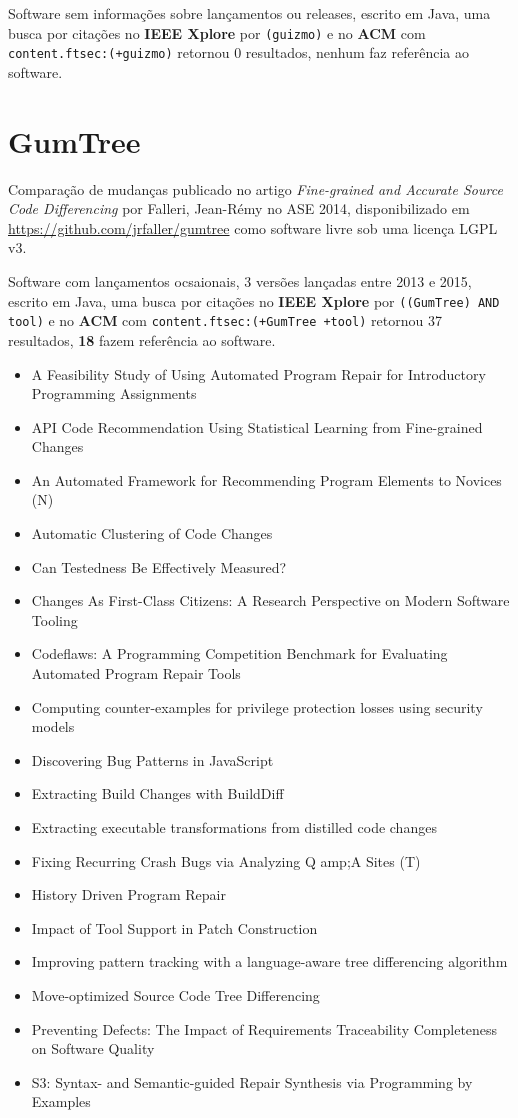 Software sem informações sobre lançamentos ou releases,
escrito em Java,
uma busca por citações no {\bf IEEE Xplore} por
\texttt{(guizmo)}
e no {\bf ACM} com
\texttt{content.ftsec:(+guizmo)}
retornou
0 resultados,
nenhum faz referência ao software.


\section{GumTree}

Comparação de mudanças
publicado no artigo {\it Fine-grained and Accurate Source Code Differencing}
por Falleri, Jean-R{\'e}my
no ASE 2014,
disponibilizado em \url{https://github.com/jrfaller/gumtree}
como software livre
sob uma licença LGPL v3.

Software com lançamentos ocsaionais,
3 versões lançadas
entre 2013 e 2015,
escrito em Java,
uma busca por citações no {\bf IEEE Xplore} por
\texttt{((GumTree) AND tool)}
e no {\bf ACM} com
\texttt{content.ftsec:(+GumTree +tool)}
retornou
37 resultados,
{\bf 18} fazem referência ao software.

\begin{itemize}
\item A Feasibility Study of Using Automated Program Repair for Introductory Programming Assignments
\item API Code Recommendation Using Statistical Learning from Fine-grained Changes
\item An Automated Framework for Recommending Program Elements to Novices (N)
\item Automatic Clustering of Code Changes
\item Can Testedness Be Effectively Measured?
\item Changes As First-Class Citizens: A Research Perspective on Modern Software Tooling
\item Codeflaws: A Programming Competition Benchmark for Evaluating Automated Program Repair Tools
\item Computing counter-examples for privilege protection losses using security models
\item Discovering Bug Patterns in JavaScript
\item Extracting Build Changes with BuildDiff
\item Extracting executable transformations from distilled code changes
\item Fixing Recurring Crash Bugs via Analyzing Q amp;A Sites (T)
\item History Driven Program Repair
\item Impact of Tool Support in Patch Construction
\item Improving pattern tracking with a language-aware tree differencing algorithm
\item Move-optimized Source Code Tree Differencing
\item Preventing Defects: The Impact of Requirements Traceability Completeness on Software Quality
\item S3: Syntax- and Semantic-guided Repair Synthesis via Programming by Examples
\end{itemize}

